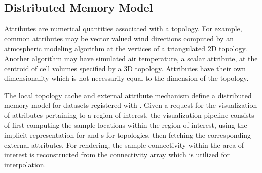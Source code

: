 \subsection{Distributed Memory Model}
Attributes are numerical quantities associated with a topology. For
example, common attributes may be vector valued wind directions computed by an
atmospheric modeling algorithm at the vertices of a triangulated 2D
topology. Another algorithm may have simulated air temperature,
a scalar attribute, at the centroid of cell volumes specified by a 3D
topology. Attributes have their own dimensionality which is not
necessarily equal to the dimension of the topology.

The local topology cache and external attribute mechanism define a
distributed memory model for datasets registered with \sciwms{}. Given
a request for the visualization of attributes pertaining to a region
of interest, the visualization pipeline consists of first computing
the sample locations within the region of interest, using the
implicit representation for \cgrid{} and \rtree{}s for \ugrid{}
topologies, then fetching the corresponding external attributes. For
rendering, the sample connectivity within the area of interest is
reconstructed from the connectivity array which is utilized for
interpolation.
